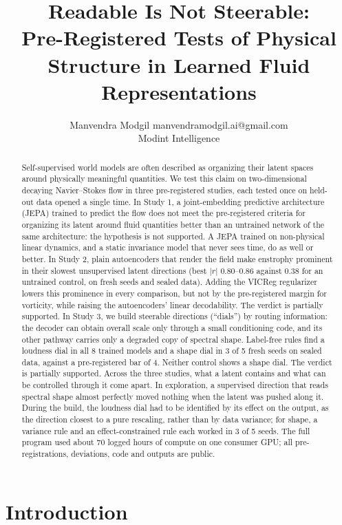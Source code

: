 \documentclass[10pt]{article}
\title{Readable Is Not Steerable:\\Pre-Registered Tests of Physical Structure in Learned Fluid Representations}
\author{\name Manvendra Modgil \email manvendramodgil.ai@gmail.com \\
          \addr Modint Intelligence}
\author{}
\newcommand{\AbstractRelease}{are public}
\newcommand{\AbstractRelease}{will be released}
\begin{document}
\maketitle

\begin{abstract}
Self-supervised world models are often described as organizing their latent spaces around physically meaningful quantities. We test this claim on two-dimensional decaying Navier--Stokes flow in three pre-registered studies, each tested once on held-out data opened a single time. In Study 1, a joint-embedding predictive architecture (JEPA) trained to predict the flow does not meet the pre-registered criteria for organizing its latent around fluid quantities better than an untrained network of the same architecture: the hypothesis is not supported. A JEPA trained on non-physical linear dynamics, and a static invariance model that never sees time, do as well or better. In Study 2, plain autoencoders that render the field make enstrophy prominent in their slowest unsupervised latent directions (best $|r|$ 0.80--0.86 against 0.38 for an untrained control, on fresh seeds and sealed data). Adding the VICReg regularizer lowers this prominence in every comparison, but not by the pre-registered margin for vorticity, while raising the autoencoders' linear decodability. The verdict is partially supported. In Study 3, we build steerable directions (``dials'') by routing information: the decoder can obtain overall scale only through a small conditioning code, and its other pathway carries only a degraded copy of spectral shape. Label-free rules find a loudness dial in all 8 trained models and a shape dial in 3 of 5 fresh seeds on sealed data, against a pre-registered bar of 4. Neither control shows a shape dial. The verdict is partially supported. Across the three studies, what a latent contains and what can be controlled through it come apart. In exploration, a supervised direction that reads spectral shape almost perfectly moved nothing when the latent was pushed along it. During the build, the loudness dial had to be identified by its effect on the output, as the direction closest to a pure rescaling, rather than by data variance; for shape, a variance rule and an effect-constrained rule each worked in 3 of 5 seeds. The full program used about 70 logged hours of compute on one consumer GPU; all pre-registrations, deviations, code and outputs \AbstractRelease{}.
\end{abstract}

\section{Introduction}\label{sec:1}
\end{document}
